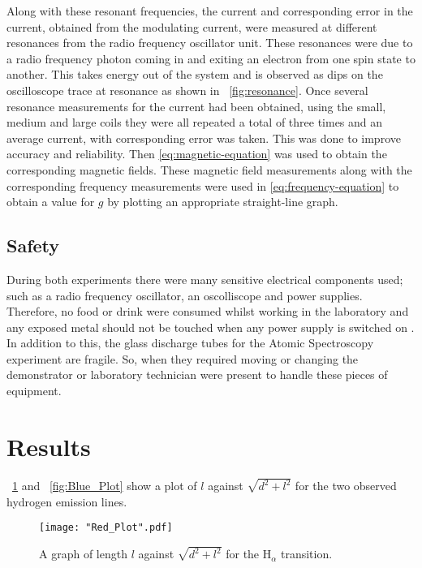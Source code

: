 \documentclass{article}
\newcommand{\figref}[2][\figurename~]{#1\ref{#2}}
\begin{document}
\vspace{2mm}
\noindent
Along with these resonant frequencies, the current and corresponding error in the current, obtained from the modulating current, were measured at different resonances from the radio frequency oscillator unit. These resonances were due to a radio frequency photon coming in and exiting an electron from one spin state to another. This takes energy out of the system and is observed as dips on the oscilloscope trace at resonance as shown in \figref{fig:resonance}. Once several resonance measurements for the current had been obtained, using the small, medium and large coils they were all repeated a total of three times and an average current, with corresponding error was taken. This was done to improve accuracy and reliability. Then \eqref{eq:magnetic-equation} was used to obtain the corresponding magnetic fields. These magnetic field measurements along with the corresponding frequency measurements were used in \eqref{eq:frequency-equation} to obtain a value for $g$ by plotting an appropriate straight-line graph. 


\subsection{Safety}
\label{ssec:safety}
During both experiments there were many sensitive electrical components used; such as a radio frequency oscillator, an oscolliscope and power supplies. Therefore, no food or drink were consumed whilst working in the laboratory and any exposed metal should not be touched when any power supply is switched on \cite{Paper01}. In addition to this,  the glass discharge tubes for the Atomic Spectroscopy experiment are fragile. So, when they required moving or changing the demonstrator or laboratory technician were present to handle these pieces of equipment. 


\section{Results}
\label{sec:results}

\figref{fig:Red_Plot} and \figref{fig:Blue_Plot} show a plot of $l$ against $\sqrt{d^2+l^2}$ for the two observed hydrogen emission lines.

\begin{figure}[h]
\centering
\texttt{[image: "Red\_Plot".pdf]}
\caption{A graph of length $l$ against $\sqrt{d^2+l^2}$ for the H$_\alpha$ transition.}
\label{fig:Red_Plot}
\end{figure}
\end{document}
